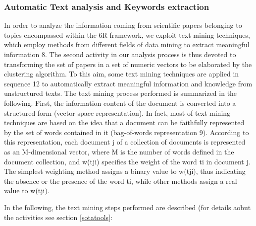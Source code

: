 \documentclass[]{book}
\begin{document}
\subsubsection*{Automatic Text analysis and Keywords
extraction}\label{automatic-text-analysis-and-keywords-extraction}

In order to analyze the information coming from scientific papers
belonging to topics encompassed within the 6R framework, we exploit text
mining techniques, which employ methods from different fields of data
mining to extract meaningful information 8. The second activity in our
analysis process is thus devoted to transforming the set of papers in a
set of numeric vectors to be elaborated by the clustering algorithm. To
this aim, some text mining techniques are applied in sequence 12 to
automatically extract meaningful information and knowledge from
unstructured texts. The text mining process performed is summarized in
the following. First, the information content of the document is
converted into a structured form (vector space representation). In fact,
most of text mining techniques are based on the idea that a document can
be faithfully represented by the set of words contained in it
(bag-of-words representation 9). According to this representation, each
document j of a collection of documents is represented as an
M-dimensional vector, where M is the number of words defined in the
document collection, and w(tji) specifies the weight of the word ti in
document j. The simplest weighting method assigns a binary value to
w(tji), thus indicating the absence or the presence of the word ti,
while other methods assign a real value to w(tji).

In the following, the text mining steps performed are described (for
details aobut the activities see section \ref{sotatools}:
\end{document}

